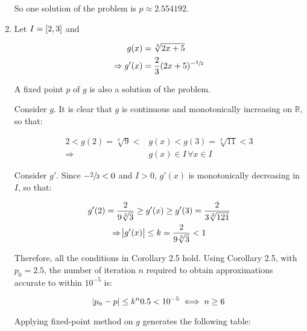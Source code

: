 \documentclass[../../../../Assignments]{subfiles}
\begin{document}
\begin{solution}
\begin{enumerate}[label = \alph*)]
            So one solution of the problem is \(p \approx \num{2.554192}\).

        \item Let \(I = \interval{2}{3}\) and

            \[\begin{aligned}
                             g(x) &= \sqrt[3]{2x + 5} \\
                \Rightarrow g'(x) &= \dfrac{2}{3} (2x + 5)^{- \sfrac{2}{3}}
            \end{aligned}\]

            A fixed point \(p\) of \(g\) is also a solution of the problem.

            Consider \(g\). It is clear that \(g\) is continuous and
            monotonically increasing on \(\mathbb{R}\), so that:

            \begin{align*}
                2 < g(2) = \sqrt[3]{9} < &g(x) < g(3) = \sqrt[3]{11} < 3 \\
                             \Rightarrow &g(x) \in I \, \forall x \in I
            \end{align*}

            Consider \(g'\). Since \(- \sfrac{2}{3} < 0\) and \(I > 0\),
            \(g'(x)\) is monotonically decreasing in \(I\), so that:

            \begin{gather*}
                g'(2) = \frac{2}{9 \sqrt[3]{3}} \geq g'(x) \geq g'(3) = \frac{2}{3 \sqrt[3]{121}} \\
                \Rightarrow \abs{g'(x)} \leq k = \frac{2}{9 \sqrt[3]{3}} < 1
            \end{gather*}

            Therefore, all the conditions in Corollary 2.5 hold. Using Corollary
            2.5, with \(p_0 = \num{2.5}\), the number of iteration \(n\)
            required to obtain approximations accurate to within \(10^{-5}\) is:

            \[\abs{p_n - p} \leq k^n \num{0.5} < 10^{-5} \iff n \geq 6\]

            Applying fixed-point method on \(g\) generates the following table:


\end{enumerate}
\end{solution}
\end{document}
